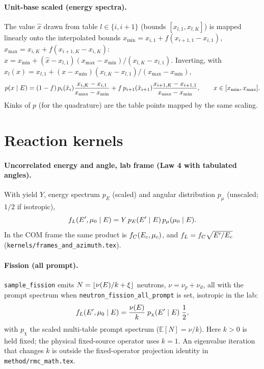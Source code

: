 \documentclass[11pt]{article}
\begin{document}
\paragraph{Unit-base scaled (energy spectra).} The value $\hat x$ drawn from table
$l \in \{i, i+1\}$ (bounds $[x_{l,1}, x_{l,K}]$) is mapped linearly onto the
interpolated bounds $x_{\min} = x_{i,1} + f(x_{i+1,1} - x_{i,1})$,
$x_{\max} = x_{i,K} + f(x_{i+1,K} - x_{i,K})$:
$x = x_{\min} + (\hat x - x_{l,1})(x_{\max} - x_{\min})/(x_{l,K} - x_{l,1})$. Inverting,
with $\hat x_l(x) = x_{l,1} + (x - x_{\min})(x_{l,K} - x_{l,1})/(x_{\max} - x_{\min})$,
\begin{equation}
  p(x \mid E) = (1-f)\,p_i(\hat x_i)\frac{x_{i,K}-x_{i,1}}{x_{\max}-x_{\min}}
  + f\,p_{i+1}(\hat x_{i+1})\frac{x_{i+1,K}-x_{i+1,1}}{x_{\max}-x_{\min}},
  \qquad x \in [x_{\min}, x_{\max}].
\end{equation}
Kinks of $p$ (for the quadrature) are the table points mapped by the same scaling.

\section{Reaction kernels}

\paragraph{Uncorrelated energy and angle, lab frame (Law 4 with tabulated angles).}
With yield $Y$, energy spectrum $p_E$ (scaled) and angular distribution $p_\mu$
(unscaled; $1/2$ if isotropic),
\begin{equation}
  f_L(E', \mu_0 \mid E) = Y\,p_E(E' \mid E)\,p_\mu(\mu_0 \mid E).
\end{equation}
In the COM frame the same product is $f_C(E_{c}, \mu_{c})$, and
$f_L = f_C\sqrt{E'/E_{c}}$ (\texttt{kernels/frames\_and\_azimuth.tex}).

\paragraph{Fission (all prompt).} \texttt{sample\_fission} emits
$N = \lfloor \nu(E)/k + \xi\rfloor$ neutrons, $\nu = \nu_p + \nu_d$, all with the prompt
spectrum when \texttt{neutron\_fission\_all\_prompt} is set, isotropic in the lab:
\begin{equation}
  f_L(E', \mu_0 \mid E) = \frac{\nu(E)}{k}\;p_\chi(E' \mid E)\;\frac{1}{2},
\end{equation}
with $p_\chi$ the scaled multi-table prompt spectrum ($\mathbb{E}[N] = \nu/k$).
Here $k>0$ is held fixed; the physical fixed-source operator uses $k=1$.
An eigenvalue iteration that changes $k$ is outside the fixed-operator projection
identity in \texttt{method/rmc\_math.tex}.
\end{document}

